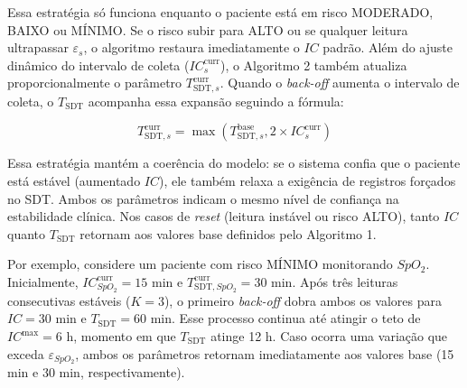 \documentclass[twoside,english,brazilian]{UNISINOSmonografia}
\begin{document}
Essa estratégia só funciona enquanto o paciente está em risco MODERADO, BAIXO ou MÍNIMO. Se o risco subir para ALTO ou se qualquer leitura ultrapassar $\varepsilon_s$, o algoritmo restaura imediatamente o $IC$ padrão.
Além do ajuste dinâmico do intervalo de coleta ($IC^{\text{curr}}_s$), o Algoritmo 2 também atualiza proporcionalmente o parâmetro $T_{\text{SDT},s}^{\text{curr}}$. Quando o \textit{back-off} aumenta o intervalo de coleta, o $T_{\text{SDT}}$ acompanha essa expansão seguindo a fórmula:

\begin{equation}
T_{\text{SDT},s}^{\text{curr}} = \max(T_{\text{SDT},s}^{\text{base}}, 2 \times IC^{\text{curr}}_s)
\end{equation}

Essa estratégia mantém a coerência do modelo: se o sistema confia que o paciente está estável (aumentado $IC$), ele também relaxa a exigência de registros forçados no SDT. Ambos os parâmetros indicam o mesmo nível de confiança na estabilidade clínica. Nos casos de \textit{reset} (leitura instável ou risco ALTO), tanto $IC$ quanto $T_{\text{SDT}}$ retornam aos valores base definidos pelo Algoritmo 1.

Por exemplo, considere um paciente com risco MÍNIMO monitorando $SpO_2$. Inicialmente, $IC^{\text{curr}}_{SpO_2} = 15$ min e $T_{\text{SDT},SpO_2}^{\text{curr}} = 30$ min. Após três leituras consecutivas estáveis ($K = 3$), o primeiro \textit{back-off} dobra ambos os valores para $IC = 30$ min e $T_{\text{SDT}} = 60$ min. Esse processo continua até atingir o teto de $IC^{\text{max}} = 6$ h, momento em que $T_{\text{SDT}}$ atinge 12 h. Caso ocorra uma variação que exceda $\varepsilon_{SpO_2}$, ambos os parâmetros retornam imediatamente aos valores base (15 min e 30 min, respectivamente).
\end{document}
